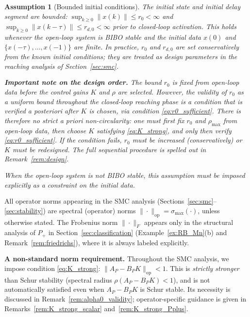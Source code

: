 \documentclass[10pt]{amsart}
\numberwithin{equation}{section}
\newtheorem{assumption}[theorem]{Assumption}
\begin{document}
\begin{assumption}[Bounded initial conditions]\label{ass:bounded_init}
The initial state and initial delay segment are bounded:
$\sup_{k\geq 0}\|x(k)\|\leq r_0 < \infty$ and
$\sup_{k\geq 0}\|x(k-\tau)\|\leq r_{d,0}<\infty$ prior to closed-loop activation.
This holds whenever the open-loop system is BIBO stable and the initial data
$x(0)$ and $\{x(-\tau),\ldots,x(-1)\}$ are finite. In practice, $r_0$ and $r_{d,0}$
are set conservatively from the known initial conditions; they are treated as design
parameters in the reaching analysis of Section~\ref{sec:smc}.

\textbf{Important note on the design order.} The bound $r_0$ is fixed from open-loop
data before the control gains $K$ and $\rho$ are selected. However, the validity of
$r_0$ as a uniform bound throughout the closed-loop reaching phase is a condition that
is \emph{verified a posteriori} after $K$ is chosen, via condition
\eqref{eq:r0_sufficient}. There is therefore no strict \emph{a priori} non-circularity:
one must first fix $r_0$ and $\rho_{\max}$ from open-loop data, then choose $K$
satisfying \eqref{eq:K_strong}, and only then verify \eqref{eq:r0_sufficient}. If the
condition fails, $r_0$ must be increased (conservatively) or $K$ must be redesigned.
The full sequential procedure is spelled out in Remark~\ref{rem:design}.

When the open-loop system is not BIBO stable, this assumption must be imposed explicitly
as a constraint on the initial data.
\end{assumption}

All operator norms appearing in the SMC analysis
(Sections~\ref{sec:smc}--\ref{sec:stability}) are spectral (operator) norms
$\|\cdot\|_{\mathrm{op}} = \sigma_{\max}(\cdot)$, unless otherwise stated. The Frobenius
norm $\|\cdot\|_F$ appears only in the structural analysis of $P_+$ in
Section~\ref{sec:classification} (Example~\ref{ex:RB_Mn}(b) and
Remark~\ref{rem:friedrichs}), where it is always labeled explicitly.

\textbf{A non-standard norm requirement.} Throughout the SMC analysis, we impose
condition \eqref{eq:K_strong}: $\|A_P - B_PK\|_{\mathrm{op}} < 1$. This is \emph{strictly
stronger} than Schur stability (spectral radius $\rho(A_P-B_PK) < 1$), and is not
automatically satisfied even when $A_P - B_PK$ is Schur stable. Its necessity is
discussed in Remark~\ref{rem:alpha0_validity}; operator-specific guidance is given in
Remarks~\ref{rem:K_strong_scalar} and~\ref{rem:K_strong_Pplus}.
\end{document}

